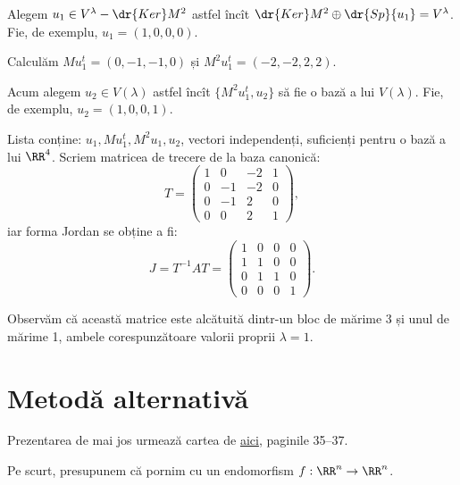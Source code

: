 Alegem $ u_1 \in V^\lambda - \dr{Ker}M^2 $ astfel încît
$ \dr{Ker}M^2 \oplus \dr{Sp} \{ u_1 \} = V^\lambda $.
Fie, de exemplu, $ u_1 = (1, 0, 0, 0) $.

Calculăm $ Mu_1^t = (0, -1, -1, 0) $ și $ M^2u_1^t = (-2, -2, 2, 2) $.

Acum alegem $ u_2 \in V(\lambda) $ astfel încît $ \{ M^2u_1^t, u_2 \} $ să
fie o bază a lui $ V(\lambda) $. Fie, de exemplu, $ u_2 = (1, 0, 0, 1) $.

Lista conține: $ u_1, Mu_1^t, M^2u_1, u_2 $, vectori independenți, suficienți
pentru o bază a lui $ \RR^4 $. Scriem matricea de trecere de la baza canonică:
\[
  T = \begin{pmatrix}
    1 & 0 & -2 & 1 \\
    0 & -1 & -2 & 0 \\
    0 & -1 & 2 & 0 \\
    0 & 0 & 2 & 1
  \end{pmatrix},
\]
iar forma Jordan se obține a fi:
\[
  J = T^{-1} AT = \begin{pmatrix}
    1 & 0 & 0 & 0 \\
    1 & 1 & 0 & 0 \\
    0 & 1 & 1 & 0 \\
    0 & 0 & 0 & 1
  \end{pmatrix}.
\]

Observăm că această matrice este alcătuită dintr-un bloc de mărime 3 și unul
de mărime 1, ambele corespunzătoare valorii proprii $ \lambda = 1 $.

\section{Metodă alternativă}

Prezentarea de mai jos urmează cartea de 
\href{https://www.scribd.com/document/76218300/Algebra-Liniara-Geometrie-Analitica-Si-Diferentiala}{aici},
paginile 35--37.

Pe scurt, presupunem că pornim cu un endomorfism $ f : \RR^n \to \RR^n $.

